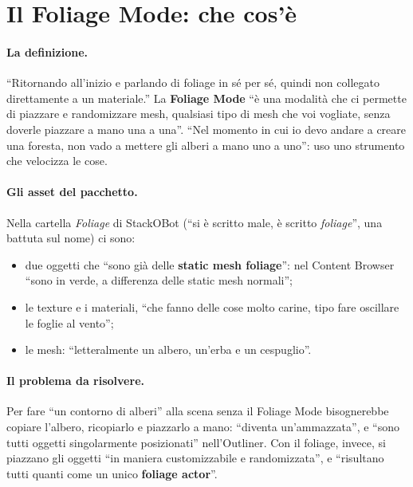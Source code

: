 \section{Il Foliage Mode: che cos'è}
\label{ue15:sec:foliage}

\paragraph{La definizione.} ``Ritornando all'inizio e parlando di foliage in sé per sé, quindi
non collegato direttamente a un materiale.'' La \textbf{Foliage Mode} ``è una modalità che ci
permette di piazzare e randomizzare mesh, qualsiasi tipo di mesh che voi vogliate, senza
doverle piazzare a mano una a una''. ``Nel momento in cui io devo andare a creare una foresta,
non vado a mettere gli alberi a mano uno a uno'': uso uno strumento che velocizza le cose.

\paragraph{Gli asset del pacchetto.} Nella cartella \emph{Foliage} di StackOBot (``si è
scritto male, è scritto \emph{foliage}'', una battuta sul nome) ci sono:
\begin{itemize}
  \item due oggetti che ``sono già delle \textbf{static mesh foliage}'': nel Content Browser
        ``sono in verde, a differenza delle static mesh normali'';
  \item le texture e i materiali, ``che fanno delle cose molto carine, tipo fare oscillare le
        foglie al vento'';
  \item le mesh: ``letteralmente un albero, un'erba e un cespuglio''.
\end{itemize}

\paragraph{Il problema da risolvere.} Per fare ``un contorno di alberi'' alla scena senza il
Foliage Mode bisognerebbe copiare l'albero, ricopiarlo e piazzarlo a mano: ``diventa
un'ammazzata'', e ``sono tutti oggetti singolarmente posizionati'' nell'Outliner. Con il
foliage, invece, si piazzano gli oggetti ``in maniera customizzabile e randomizzata'', e
``risultano tutti quanti come un unico \textbf{foliage actor}''.

